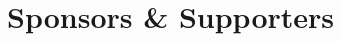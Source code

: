 
\newcommand{\sponsoriconS}[1]{{\texttt{[image: \#1]}}}
\newcommand{\sponsoriconM}[1]{{\texttt{[image: \#1]}}}
\newcommand{\sponsoriconL}[1]{{\texttt{[image: \#1]}}}
\newcommand{\sponsoriconX}[1]{{\texttt{[image: \#1]}}}




\section{Sponsors \& Supporters}

